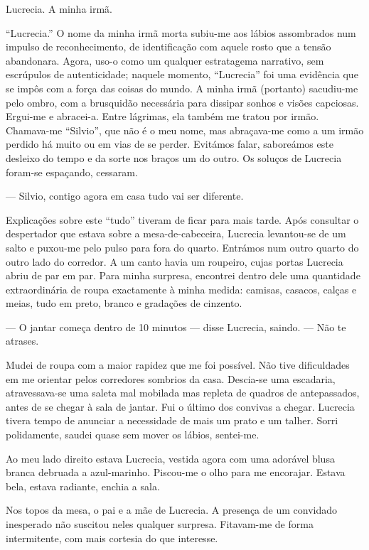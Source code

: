 Lucrecia. A minha irmã.

``Lucrecia.'' O nome da minha irmã morta subiu-me aos lábios assombrados
num impulso de reconhecimento, de identificação com aquele rosto que a
tensão abandonara. Agora, uso-o como um qualquer estratagema narrativo,
sem escrúpulos de autenticidade; naquele momento, ``Lucrecia'' foi uma
evidência que se impôs com a força das coisas do mundo. A minha irmã
(portanto) sacudiu-me pelo ombro, com a brusquidão necessária para
dissipar sonhos e visões capciosas. Ergui-me e abracei-a. Entre
lágrimas, ela também me tratou por irmão. Chamava-me ``Silvio'', que não
é o meu nome, mas abraçava-me como a um irmão perdido há muito ou em
vias de se perder. Evitámos falar, saboreámos este desleixo do tempo e
da sorte nos braços um do outro. Os soluços de Lucrecia foram-se
espaçando, cessaram.

--- Silvio, contigo agora em casa tudo vai ser diferente.

Explicações sobre este ``tudo'' tiveram de ficar para mais tarde. Após
consultar o despertador que estava sobre a mesa-de-cabeceira, Lucrecia levantou-se de um salto e puxou-me pelo pulso
para fora do quarto. Entrámos num outro quarto do outro lado do
corredor. A um canto havia um roupeiro, cujas portas Lucrecia abriu de
par em par. Para minha surpresa, encontrei dentro dele uma quantidade
extraordinária
de roupa exactamente à minha medida: camisas, casacos, calças e meias,
tudo em preto, branco e gradações de cinzento.

--- O jantar começa dentro de 10 minutos --- disse Lucrecia, saindo.
--- Não te atrases.

Mudei de roupa com a maior rapidez que me foi possível. Não tive
dificuldades em me orientar pelos corredores sombrios da casa.
Descia-se uma escadaria, atravessava-se uma saleta mal mobilada mas
repleta de quadros de antepassados, antes de se chegar à sala de jantar.
Fui o último dos convivas a chegar. Lucrecia tivera tempo de anunciar a
necessidade de mais um prato e um talher. Sorri polidamente, saudei
quase sem mover os lábios, sentei-me.

Ao meu lado direito estava Lucrecia, vestida agora com uma adorável
blusa branca debruada a azul-marinho. Piscou-me o olho para me encorajar. Estava bela, estava radiante, enchia a
sala.

Nos topos da mesa, o pai e a mãe de Lucrecia. A presença de um convidado
inesperado não suscitou neles qualquer surpresa. Fitavam-me de forma
intermitente, com mais cortesia do que interesse.


